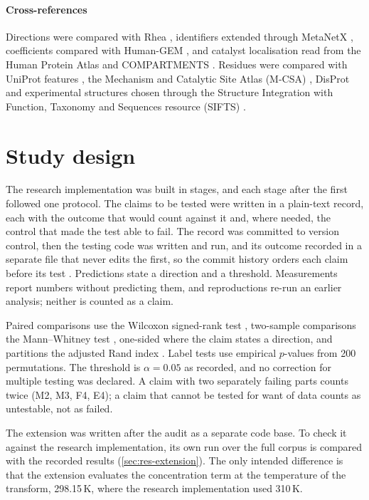 \documentclass[5p]{elsarticle}
\theoremstyle{definition}
\theoremstyle{plain}
\begin{document}
\paragraph{Cross-references}
Directions were compared with Rhea \citep{bansal2022rhea}, identifiers extended through MetaNetX \citep{moretti2021metanetx}, coefficients compared with Human-GEM \citep{robinson2020humangem}, and catalyst localisation read from the Human Protein Atlas and COMPARTMENTS \citep{thul2017hpa,binder2014compartments}.
Residues were compared with UniProt features \citep{uniprot2023}, the Mechanism and Catalytic Site Atlas (M-CSA) \citep{ribeiro2018mcsa}, DisProt \citep{quaglia2022disprot} and experimental structures chosen through the Structure Integration with Function, Taxonomy and Sequences resource (SIFTS) \citep{berman2000pdb,velankar2013sifts}.

\section{Study design}
\label{sec:protocol}

The research implementation was built in stages, and each stage after the first followed one protocol.
The claims to be tested were written in a plain-text record, each with the outcome that would count against it and, where needed, the control that made the test able to fail.
The record was committed to version control, then the testing code was written and run, and its outcome recorded in a separate file that never edits the first, so the commit history orders each claim before its test \citep{nosek2018preregistration}.
Predictions state a direction and a threshold.
Measurements report numbers without predicting them, and reproductions re-run an earlier analysis; neither is counted as a claim.

Paired comparisons use the Wilcoxon signed-rank test \citep{wilcoxon1945individual}, two-sample comparisons the Mann--Whitney test \citep{mann1947test}, one-sided where the claim states a direction, and partitions the adjusted Rand index \citep{hubert1985comparing}.
Label tests use empirical $p$-values from 200 permutations.
The threshold is $\alpha=0.05$ as recorded, and no correction for multiple testing was declared.
A claim with two separately failing parts counts twice (M2, M3, F4, E4); a claim that cannot be tested for want of data counts as untestable, not as failed.

The extension was written after the audit as a separate code base.
To check it against the research implementation, its own run over the full corpus is compared with the recorded results (\cref{sec:res-extension}).
The only intended difference is that the extension evaluates the concentration term at the temperature of the transform, 298.15\,K, where the research implementation used 310\,K.
\end{document}
